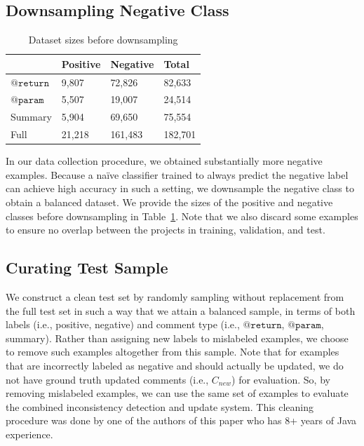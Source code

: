 \documentclass[letterpaper]{article} %
\makeatletter
\newcommand{\CodeIn}[1]{{\ifmmode{\mathtt{#1}}\else$\mathtt{#1}$\fi}}
\newcommand{\Return}{\CodeIn{@return}}
\newcommand{\Param}{\CodeIn{@param}}
\newcommand{\NewComment}{$C_{new}$}
\makeatother
\begin{document}
\subsection{Downsampling Negative Class}

\begin{table}
\centering
\small
\begin{tabular}{l@{\hskip 3mm}lll}
\hline
& \bf Positive & \bf Negative & \bf Total \\
\hline
\Return{} & 9,807 & 72,826 & 82,633 \\
\Param{} & 5,507 & 19,007 & 24,514 \\
Summary & 5,904 & 69,650 & 75,554 \\
\hline
Full & 21,218 & 161,483 & 182,701\\
\hline
\end{tabular}
\vspace{-5pt}
\caption{\label{table:downsample}Dataset sizes before downsampling}
\vspace{-10pt}
\end{table}

In our data collection procedure, we obtained substantially more negative examples.
Because a na\"ive classifier trained to always predict the negative label can achieve high accuracy in such a setting, we downsample the negative class to obtain a balanced dataset. We provide the sizes of the positive and negative classes before downsampling in Table~\ref{table:downsample}. Note that we also discard some examples to ensure no overlap between the projects in training, validation, and test.

\subsection{Curating Test Sample}
\label{appendix:annotation}
We construct a clean test set by randomly sampling without replacement from the full test set in such a way that we attain a balanced sample, in terms of both labels (i.e., positive, negative) and comment type (i.e., \Return{}, \Param{}, summary). Rather than assigning new labels to mislabeled examples, we choose to remove such examples altogether from this sample. Note that for examples that are incorrectly labeled as negative and should actually be updated, we do not have ground truth updated comments (i.e., \NewComment{}) for evaluation. So, by removing mislabeled examples, we can use the same set of examples to evaluate the combined inconsistency detection and update system. %
This cleaning procedure was done by one of the authors of this paper who has 8+ years of Java experience.
\end{document}
